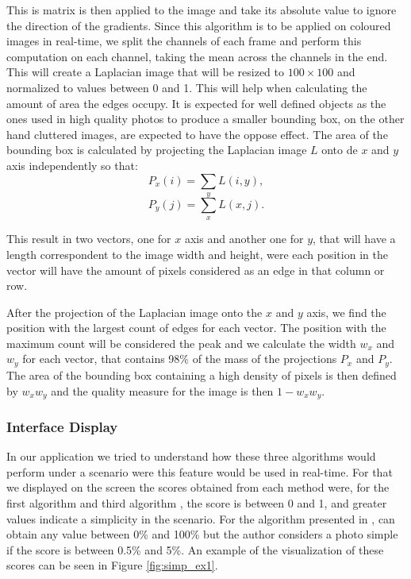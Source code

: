 This is matrix is then applied to the image and take its absolute value to ignore the direction of the gradients. Since this algorithm is to be applied on coloured images in real-time, we split the channels of each frame and perform this computation on each channel, taking the mean across the channels in the end. This will create a Laplacian image that will be resized to $100\times100$ and normalized to values between 0 and 1. This will help when calculating the amount of area the edges occupy. It is expected for well defined objects as the ones used in high quality photos to produce a smaller bounding box, on the other hand cluttered images, are expected to have the oppose effect.
The area of the bounding box is calculated by projecting the Laplacian image $L$ onto de $x$ and $y$ axis independently so that:
\begin{equation}
P_{x}(i) = \sum_{y} L(i,y),
\end{equation}
\begin{equation}
P_{y}(j) = \sum_{x} L(x,j).
\end{equation}

This result in two vectors, one for $x$ axis and another one for $y$, that will have a length correspondent to the image width and height, were each position in the vector will have the amount of pixels considered as an edge in that column or row.

After the projection of the Laplacian image onto the $x$ and $y$ axis, we find the position with the largest count of edges for each vector. The position with the maximum count will be considered the peak and we calculate the width $w_{x}$ and $w_{y}$ for each vector, that contains 98\% of the mass of the projections $P_{x}$ and $P_{y}$. The area of the bounding box containing a high density of pixels is then defined by $w_{x}w_{y}$ and the quality measure for the image is then $1-w_{x}w_{y}$.

\subsubsection{Interface Display}

In our application we tried to understand how these three algorithms would perform under a scenario were this feature would be used in real-time. For that we displayed on the screen the scores obtained from each method were, for the first algorithm\cite{kaoautomatic} and third algorithm \cite{ke2006design}, the score is between 0 and 1, and greater values indicate a simplicity in the scenario. 
For the algorithm presented in \cite{luo2008photo}, can obtain any value between 0\% and 100\% but the author considers a photo simple if the score is between 0.5\% and 5\%. An example of the visualization of these scores can be seen in Figure \ref{fig:simp_ex1}.

